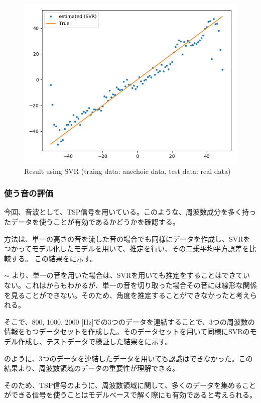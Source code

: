 \begin{figure}[ht]
  \begin{center}
  \vspace{1zh}
    \includegraphics[width=0.48\linewidth]{images/3_anechoic_model_real_data.png}   
  \end{center}
  \caption{Result using SVR (traing data: anechoic data, test data: real data)}
  \label{fig:result_svr_2}
\end{figure}

\clearpage

\subsubsection{使う音の評価}
\label{sec:result_svr_sound_kind}
今回、音波として、TSP信号を用いている。このような、周波数成分を多く持ったデータを使うことが有効であるかどうかを確認する。

方法は、単一の高さの音を流した音の場合でも同様にデータを作成し、SVRをつかってモデル化したモデルを用いて、推定を行い、その二乗平均平方誤差を比較する。
この結果をに示す。

 $\sim$ より、単一の音を用いた場合は、SVRを用いても推定をすることはできていない。これはからもわかるが、単一の音を切り取った場合その音には線形な関係を見ることができない。そのため、角度を推定することができなかったと考えられる。

そこで、800, 1000, 2000 [Hz]での3つのデータを連結することで、3つの周波数の情報をもつデータセットを作成した。そのデータセットを用いて同様にSVRのモデル作成し、テストデータで検証した結果をに示す。

のように、3つのデータを連結したデータを用いても認識はできなかった。この結果より、周波数領域のデータの重要性が理解できる。

そのため、TSP信号のように、周波数領域に関して、多くのデータを集めることができる信号を使うことはモデルベースで解く際にも有効であると考えられる。

